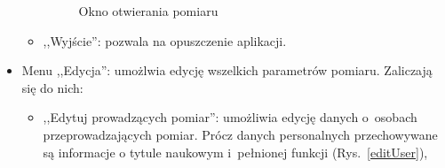 \begin{itemize}
\begin{itemize}
\begin{figure}[!htb]
\centering 		
  \hspace{2mm}
\caption{Okno otwierania pomiaru} 	
\label{openSurvey}
\end{figure}

\item ,,Wyjście'': pozwala na opuszczenie aplikacji.
\end{itemize}

\item Menu ,,Edycja'': umożlwia edycję wszelkich parametrów pomiaru. Zaliczają się do nich:
\begin{itemize}
\item ,,Edytuj prowadzących pomiar'': umożliwia edycję danych o~osobach przeprowadzających pomiar. Prócz danych personalnych przechowywane są informacje o tytule naukowym i~pełnionej funkcji (Rys.~\ref{editUser}),


\end{itemize}
\end{itemize}
